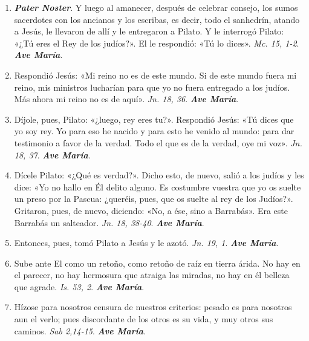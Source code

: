 \documentclass[../../devocionario.tex]{subfiles}
\begin{document}
    \begin{enumerate}
    
        \item \textbf{\emph{Pater Noster}}. Y luego al amanecer, después de celebrar consejo, los sumos sacerdotes con los ancianos y los escribas, 
            es decir, todo el sanhedrín, atando a Jesús, le llevaron de allí y le entregaron a Pilato. 
            Y le interrogó Pilato: «¿Tú eres el Rey de los judíos?». El le respondió: «Tú lo dices». \emph{Mc. 15, 1-2}. \textbf{\emph{Ave María}}.

        \item Respondió Jesús: «Mi reino no es de este mundo. Si de este mundo fuera mi reino, mis ministros lucharían para 
            que yo no fuera entregado a los judíos. Más ahora mi reino no es de aquí». \emph{Jn. 18, 36}. \textbf{\emph{Ave María}}.

        \item Díjole, pues, Pilato: «¿luego, rey eres tu?». Respondió Jesús: «Tú dices que yo soy rey. Yo para eso he nacido y 
            para esto he venido al mundo: para dar testimonio a favor de la verdad. 
            Todo el que es de la verdad, oye mi voz». \emph{Jn. 18, 37}. \textbf{\emph{Ave María}}.

        \item Dícele Pilato: «¿Qué es verdad?». Dicho esto, de nuevo, salió a los judíos y les dice: 
            «Yo no hallo en Él delito alguno. Es costumbre vuestra que yo os suelte un preso por la Pascua: ¿queréis, pues, 
            que os suelte al rey de los Judíos?». Gritaron, pues, de nuevo, diciendo: «No, a ése, sino a Barrabás». 
            Era este Barrabás un salteador. \emph{Jn. 18, 38-40}. \textbf{\emph{Ave María}}.

        \item Entonces, pues, tomó Pilato a Jesús y le azotó. \emph{Jn. 19, 1}. \textbf{\emph{Ave María}}.

        \item Sube ante El como un retoño, como retoño de raíz en tierra árida. No hay en el parecer, no hay hermosura que atraiga las miradas, no hay en él belleza que agrade.
            \emph{Is. 53, 2}. \textbf{\emph{Ave María}}.

        \item Hízose para nosotros censura de nuestros criterios: pesado es para nosotros aun el verlo; 
            pues discordante de los otros es su vida, y muy otros sus caminos. \emph{Sab 2,14-15}. \textbf{\emph{Ave María}}.


\end{enumerate}
\end{document}
